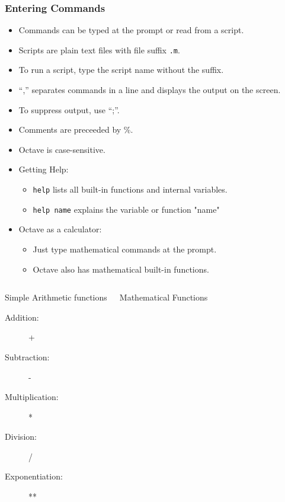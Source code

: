 \documentclass[slidestop,mathserif,compress,xcolor=svgnames]{beamer}
\newenvironment{eblock}[0]
{
\begin{beamerboxesrounded}[upper=uppercol2,lower=lowercol2,shadow=true]}
{\end{beamerboxesrounded}}
\begin{document}
\begin{frame}[allowframebreaks]
  \frametitle{\small Entering Commands}
  \begin{itemize}
    \item Commands can be typed at the prompt or read from a script.
    \item Scripts are plain text files with file suffix \texttt{.m}.
    \item To run a script, type the script name without the suffix.
    \item ``,'' separates commands in a line and displays the output on the screen.
    \item To suppress output, use ``;''.
    \item Comments are preceeded by \%.
    \item Octave is case-sensitive.
    \item Getting Help:
    \begin{itemize}
      \item \texttt{help} lists all built-in functions and internal variables.
      \item \texttt{help name} explains the variable or function "name"
    \end{itemize}
    \framebreak
    \item Octave as a calculator:
    \begin{itemize}
      \item Just type mathematical commands at the prompt.
      \item Octave also has mathematical built-in functions.
    \end{itemize}
  \end{itemize}
  \begin{columns}
    \begin{eblock}{Simple Arithmetic functions}
      \begin{description}
        \item[Addition:] +
        \item[Subtraction:] -
        \item[Multiplication:] *
        \item[Division:] /
        \item[Exponentiation:] **
      \end{description}
    \end{eblock}
    \begin{eblock}{Mathematical Functions}
      \begin{description}

\end{description}
\end{eblock}
\end{columns}
\end{frame}
\end{document}
